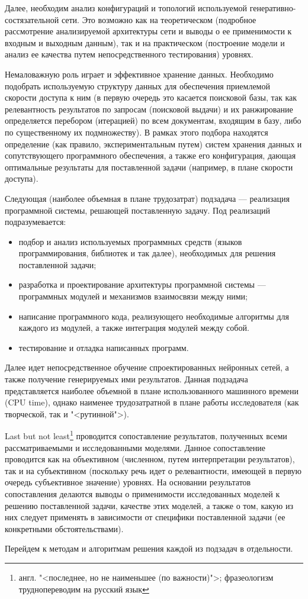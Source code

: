 Далее, необходим анализ конфигураций и топологий используемой генеративно-состязательной сети. Это возможно как на теоретическом
(подробное рассмотрение анализируемой архитектуры сети и выводы о ее применимости к входным и выходным данным), так и на практическом
(построение модели и анализ ее качества путем непосредственного тестирования) уровнях.

Немаловажную роль играет и эффективное хранение данных. Необходимо подобрать используемую структуру данных для обеспечения приемлемой
скорости доступа к ним (в первую очередь это касается поисковой базы, так как релевантность результатов по запросам (поисковой выдачи)
и их ранжирование определяется перебором (итерацией) по всем документам, входящим в базу, либо по существенному их подмножеству).
В рамках этого подбора находятся определение (как правило, экспериментальным путем) систем хранения данных и сопутствующего программного
обеспечения, а также его конфигурация, дающая оптимальные результаты для поставленной задачи (например, в плане скорости доступа).

Следующая (наиболее объемная в плане трудозатрат) подзадача --- реализация программной системы, решающей поставленную задачу. Под 
реализаций подразумевается:
\begin{itemize}
      \item подбор и анализ используемых программных средств (языков программирования, библиотек и так далее), 
            необходимых для решения поставленной задачи;
      \item разработка и проектирование архитектуры программной системы --- программных модулей и механизмов взаимосвязи между ними;
      \item написание программного кода, реализующего необходимые алгоритмы для каждого из модулей, а также интеграция модулей между собой.
      \item тестирование и отладка написанных программ.
\end{itemize}

Далее идет непосредственное обучение спроектированных нейронных сетей, а также получение генерируемых ими результатов. Данная подзадача
представляется наиболее объемной в плане использованного машинного времени (CPU time), однако наименее трудозатратной в плане
работы исследователя (как творческой, так и "<рутинной">).

Last but not least\footnote{англ. "<последнее, но не наименьшее (по важности)">; фразеологизм труднопереводим на русский язык}
проводится сопоставление результатов, полученных всеми рассматриваемыми и исследованными моделями. Данное сопоставление проводится
как на объективном (численном, путем интерпретации результатов), так и на субъективном (поскольку речь идет о релевантности,
имеющей в первую очередь субъективное значение) уровнях. На основании результатов сопоставления делаются выводы о применимости
исследованных моделей к решению поставленной задачи, качестве этих моделей, а также о том, какую из них следует применять в зависимости
от специфики поставленной задачи (ее конкретными обстоятельствами).

Перейдем к методам и алгоритмам решения каждой из подзадач в отдельности.